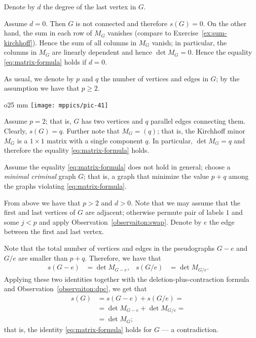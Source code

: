 Denote by $d$ the degree of the last vertex in $G$.

Assume $d=0$.
Then $G$ is not connected and therefore $s(G)=0$.
On the other hand, the sum in each row of $M_G$ vanishes (compare to Exercise~\ref{ex:sum-kirchhoff}).
Hence the sum of all columns in $M_G$ vanish;
in particular, the columns in $M_G$ are linearly dependent and hence $\det M_G=0$.
Hence the equality \ref{eq:matrix-formula} holds if $d=0$.

As usual, we denote by $p$ and $q$ the number of vertices and edges in $G$; by the assumption we have that $p\ge 2$.

\begin{wrapfigure}{o}{25 mm}
\vskip0mm
\centering
\texttt{[image: mppics/pic-41]}
\end{wrapfigure}

Assume $p=2$; that is, $G$ has two vertices and $q$ parallel edges connecting them.
Clearly, $s(G)=q$.
Further note that $M_G=(q)$; that is,  the Kirchhoff minor $M_G$ is a $1{\times}1$ matrix with a single component $q$.
In particular, $\det M_G=q$ and therefore the equality \ref{eq:matrix-formula} holds.

Assume the equality \ref{eq:matrix-formula} does not hold in general;
choose a \emph{minimal criminal} graph $G$;
that is, a graph that minimize the value $p+q$ among the graphs violating \ref{eq:matrix-formula}.

From above we have that $p>2$ and $d>0$.
Note that we may assume that the first and last vertices of $G$ are adjacent;
otherwise permute pair of labels $1$ and some $j<p$  and apply Observation~\ref{observaiton:swap}.
Denote by $e$ the edge between the first and last vertex.

Note that the total number of vertices and edges in the pseudographs $G- e$ and $G/e$ are smaller than $p+q$.
Therefore, we have that
\begin{align*}
s(G- e)&=\det M_{G- e},
&
s(G/e)&=\det M_{G/e}.
\end{align*}
Applying these two identities together with the deletion-plus-contraction formula 
and Observation~\ref{observaiton:dpc}, we get that
\begin{align*}
s(G)&=s(G- e)+s(G/e)=
\\
&=\det M_{G- e}+\det M_{G/e}=
\\
&=\det M_G;
\end{align*}
that is, the identity \ref{eq:matrix-formula} holds for $G$ --- a contradiction.
\qeds


